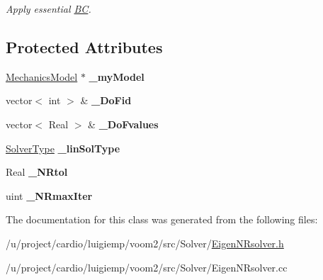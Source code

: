 \begin{DoxyCompactItemize}
\begin{DoxyCompactList}\small\item\em Apply essential \hyperlink{struct_b_c}{BC}. \item\end{DoxyCompactList}\end{DoxyCompactItemize}
\subsection*{Protected Attributes}
\begin{DoxyCompactItemize}
\item 
\hypertarget{classvoom_1_1_eigen_n_rsolver_a091b81cda6ae358080a26fa1397bb2d0}{
\hyperlink{classvoom_1_1_mechanics_model}{MechanicsModel} $\ast$ {\bfseries \_\-myModel}}
\label{classvoom_1_1_eigen_n_rsolver_a091b81cda6ae358080a26fa1397bb2d0}

\item 
\hypertarget{classvoom_1_1_eigen_n_rsolver_a158262012a884e89d858685d5f530a83}{
vector$<$ int $>$ \& {\bfseries \_\-DoFid}}
\label{classvoom_1_1_eigen_n_rsolver_a158262012a884e89d858685d5f530a83}

\item 
\hypertarget{classvoom_1_1_eigen_n_rsolver_a25b06a7cf90c5bafcebed451ab988644}{
vector$<$ Real $>$ \& {\bfseries \_\-DoFvalues}}
\label{classvoom_1_1_eigen_n_rsolver_a25b06a7cf90c5bafcebed451ab988644}

\item 
\hypertarget{classvoom_1_1_eigen_n_rsolver_ab432ebb6442be51a4c032c9fe0e8783a}{
\hyperlink{namespacevoom_a2874640a1124292b983171d745088fef}{SolverType} {\bfseries \_\-linSolType}}
\label{classvoom_1_1_eigen_n_rsolver_ab432ebb6442be51a4c032c9fe0e8783a}

\item 
\hypertarget{classvoom_1_1_eigen_n_rsolver_a9414256a12b5b5a83b2f349f8244dfcc}{
Real {\bfseries \_\-NRtol}}
\label{classvoom_1_1_eigen_n_rsolver_a9414256a12b5b5a83b2f349f8244dfcc}

\item 
\hypertarget{classvoom_1_1_eigen_n_rsolver_af225056a77b047d00460d39752b91786}{
uint {\bfseries \_\-NRmaxIter}}
\label{classvoom_1_1_eigen_n_rsolver_af225056a77b047d00460d39752b91786}

\end{DoxyCompactItemize}


The documentation for this class was generated from the following files:\begin{DoxyCompactItemize}
\item 
/u/project/cardio/luigiemp/voom2/src/Solver/\hyperlink{_eigen_n_rsolver_8h}{EigenNRsolver.h}\item 
/u/project/cardio/luigiemp/voom2/src/Solver/EigenNRsolver.cc\end{DoxyCompactItemize}
